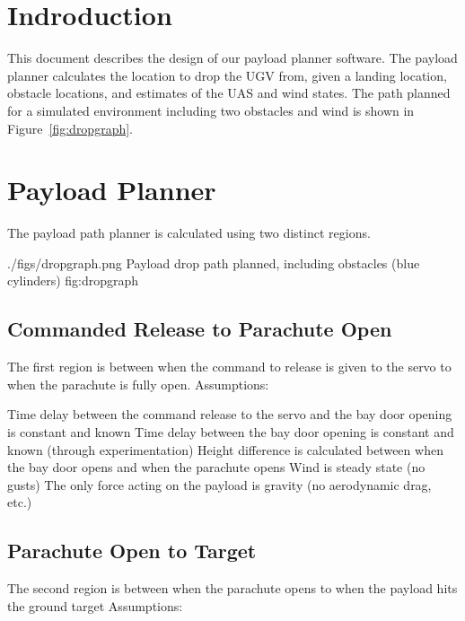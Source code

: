 \documentclass[]{auvsi_doc}
\begin{document}
\begin{AUVSITitlePage}
\begin{artifacttable}
\end{artifacttable}
\end{AUVSITitlePage}


\section{Indroduction}
This document describes the design of our payload planner software. The payload planner calculates the location to drop the UGV from, given a landing location, obstacle locations, and estimates of the UAS and wind states.
The path planned for a simulated environment including two obstacles and wind is shown in Figure~\ref{fig:dropgraph}.
\section{Payload Planner}

The payload path planner is calculated using two distinct regions.


\AUVSIFigure
{./figs/dropgraph.png}
{\textwidth}
{Payload drop path planned, including obstacles (blue cylinders)}
{fig:dropgraph}

\subsection{Commanded Release to Parachute Open}

The first region is between when the command to release is given to the servo to when the parachute is fully open. Assumptions:

    Time delay between the command release to the servo and the bay door opening is constant and known
    Time delay between the bay door opening is constant and known (through experimentation)
    Height difference is calculated between when the bay door opens and when the parachute opens
    Wind is steady state (no gusts)
    The only force acting on the payload is gravity (no aerodynamic drag, etc.)

\subsection{Parachute Open to Target}

The second region is between when the parachute opens to when the payload hits the ground target Assumptions:
\end{document}
